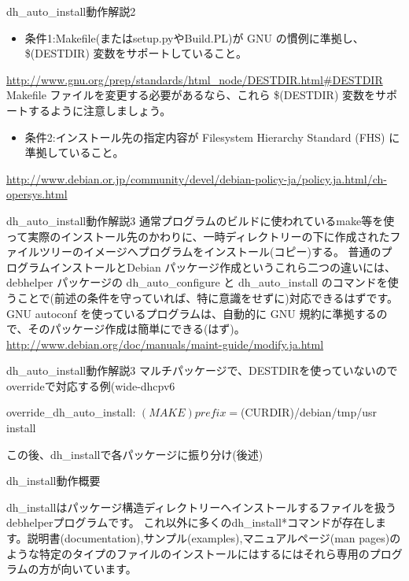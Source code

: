 \begin{frame}{dh\_auto\_install動作解説2}
\begin{itemize}
\item 条件1:Makefile(またはsetup.pyやBuild.PL)が GNU の慣例に準拠し、\$(DESTDIR) 変数をサポートしていること。
\end{itemize}
\url{http://www.gnu.org/prep/standards/html\_node/DESTDIR.html\#DESTDIR}
\\
Makefile ファイルを変更する必要があるなら、これら \$(DESTDIR) 変数をサポートするように注意しましょう。
\begin{itemize}
\item 条件2:インストール先の指定内容が Filesystem Hierarchy Standard (FHS) に準拠していること。
\end{itemize}
\url{http://www.debian.or.jp/community/devel/debian-policy-ja/policy.ja.html/ch-opersys.html}
\end{frame}

\begin{frame}{dh\_auto\_install動作解説3}
通常プログラムのビルドに使われているmake等を使って実際のインストール先のかわりに、一時ディレクトリーの下に作成されたファイルツリーのイメージへプログラムをインストール(コピー)する。
 普通のプログラムインストールとDebian パッケージ作成というこれら二つの違いには、debhelper パッケージの dh\_auto\_configure と dh\_auto\_install のコマンドを使うことで(前述の条件を守っていれば、特に意識をせずに)対応できるはずです。
GNU autoconf を使っているプログラムは、自動的に GNU 規約に準拠するので、そのパッケージ作成は簡単にできる(はず)。
\url{http://www.debian.org/doc/manuals/maint-guide/modify.ja.html}
\end{frame}

\begin{frame}[containsverbatim]{dh\_auto\_install動作解説3}
マルチパッケージで、DESTDIRを使っていないのでoverrideで対応する例(wide-dhcpv6
\begin{commandline}
override_dh_auto_install:
        $(MAKE) prefix=$(CURDIR)/debian/tmp/usr install
\end{commandline}
この後、dh\_installで各パッケージに振り分け(後述)

\end{frame}



\begin{frame}{dh\_install動作概要}

dh\_installはパッケージ構造ディレクトリーへインストールするファイルを扱うdebhelperプログラムです。
これ以外に多くのdh\_install*コマンドが存在します。説明書(documentation),サンプル(examples),マニュアルページ(man pages)のような特定のタイプのファイルのインストールにはするにはそれら専用のプログラムの方が向いています。
\end{frame}


